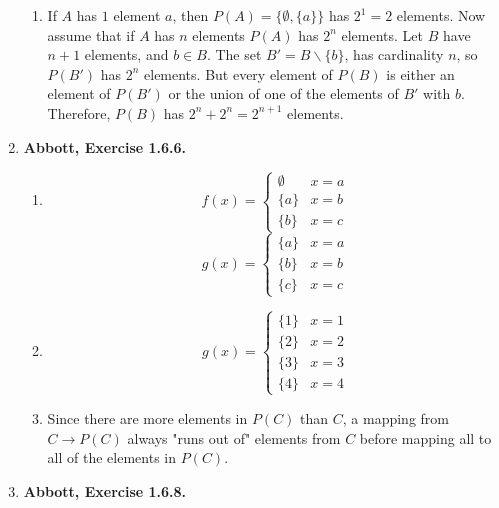 \documentclass{article}
\newcommand{\exc}[2][Abbott]{\item \textbf{#1, Exercise #2.}}
\begin{document}
\begin{enumerate}
\begin{enumerate}
		\item If $A$ has $1$ element $a$, then $P(A) = \{\emptyset, \{a\}\}$ has $2^1 = 2$ elements. Now assume that if $A$ has $n$ elements $P(A)$ has $2^n$ elements. Let $B$ have $n + 1$ elements, and $b \in B$. The set $B' = B \backslash \{b\}$, has cardinality $n$, so $P(B')$ has $2^n$ elements. But every element of $P(B)$ is either an element of $P(B')$ or the union of one of the elements of $B'$ with $b$. Therefore, $P(B)$ has $2^n + 2^n = 2^{n+1}$ elements.
	\end{enumerate}
				      	          
	\exc{1.6.6}
				      	          
	\begin{enumerate}
		\item \begin{equation*}
		      f(x) = \begin{cases}
		      \emptyset & x = a \\
		      \{a\} & x = b \\
		      \{b\} & x = c
		\end{cases}
		\end{equation*}
		\begin{equation*}
			g(x) = \begin{cases}
			\{a\} & x = a \\
			\{b\} & x = b \\
			\{c\} & x = c
			\end{cases}
		\end{equation*}
							      		      	        
		\item \begin{equation*}
		      g(x) = \begin{cases}
		      \{1\} & x = 1 \\
		      \{2\} & x = 2 \\
		      \{3\} & x = 3 \\ 
		      \{4\} & x = 4
		\end{cases}
		\end{equation*}
							      		      	        
		\item Since there are more elements in $P(C)$ than $C$, a mapping from $C \rightarrow P(C)$ always "runs out of" elements from $C$ before mapping all to all of the elements in $P(C)$.
	\end{enumerate}
				      	          
	\exc{1.6.8}
				      	          

\end{enumerate}
\end{document}
